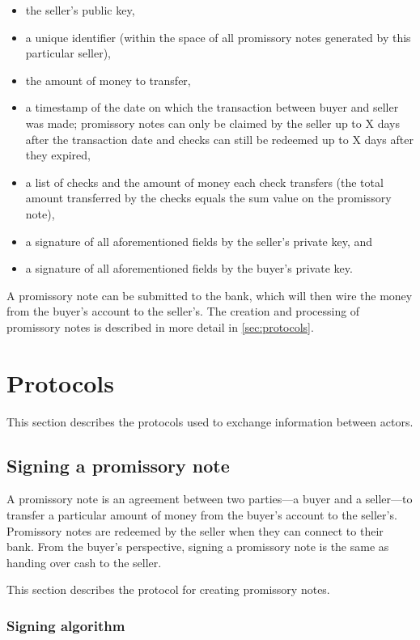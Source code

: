 \documentclass[12pt,a4paper]{article}
\begin{document}
\begin{multicols}{2}
	\begin{itemize}
		\item the seller's public key,
		\item a unique identifier (within the space of all promissory notes generated by this particular seller),
		\item the amount of money to transfer,
		\item a timestamp of the date on which the transaction between buyer and seller was made; promissory notes can only be claimed by the seller up to X days after the transaction date and checks can still be redeemed up to X days after they expired,
		\item a list of checks and the amount of money each check transfers (the total amount transferred by the checks equals the sum value on the promissory note),
		\item a signature of all aforementioned fields by the seller's private key, and
		\item a signature of all aforementioned fields by the buyer's private key.
	\end{itemize}

	A promissory note can be submitted to the bank, which will then wire the money from the buyer's account to the seller's. The creation and processing of promissory notes is described in more detail in \autoref{sec:protocols}.

	\section{Protocols}
	\label{sec:protocols}
	
	This section describes the protocols used to exchange information between actors.
	
	\subsection{Signing a promissory note}

	A promissory note is an agreement between two parties---a buyer and a seller---to transfer a particular amount of money from the buyer's account to the seller's. Promissory notes are redeemed by the seller when they can connect to their bank. From the buyer's perspective, signing a promissory note is the same as handing over cash to the seller. 
	
	This section describes the protocol for creating promissory notes.

	\subsubsection{Signing algorithm}
	

\end{multicols}
\end{document}
